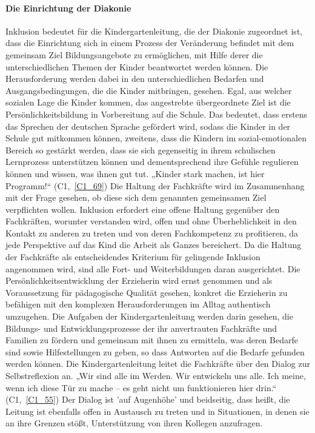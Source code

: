 \paragraph{Die Einrichtung der Diakonie} 
Inklusion bedeutet für die Kindergartenleitung, die der Diakonie zugeordnet ist, dass die Einrichtung sich in einem Prozess der Veränderung befindet mit dem gemeinsam Ziel Bildungsangebote zu ermöglichen, mit Hilfe derer die unterschiedlichen Themen der Kinder beantwortet werden können. Die Herausforderung werden dabei in den unterschiedlichen Bedarfen und Ausgangsbedingungen, die die Kinder mitbringen, gesehen. 
Egal, aus welcher sozialen Lage die Kinder kommen, das angestrebte übergeordnete Ziel ist die Persönlichkeitsbildung in Vorbereitung auf die Schule. Das bedeutet, dass erstens das Sprechen der deutschen Sprache gefördert wird, sodass die Kinder in der Schule gut mitkommen können, zweitens, dass die Kindern im sozial-emotionalen Bereich so gestärkt werden, dass sie sich gegenseitig in ihrem schulischen Lernprozess unterstützen können und dementsprechend ihre Gefühle regulieren können und wissen, was ihnen gut tut. „Kinder stark machen, ist hier Programm!“ (C1,~\ref{C1_69})
Die Haltung der Fachkräfte wird im Zusammenhang mit der Frage gesehen, ob diese sich dem genannten gemeinsamen Ziel verpflichten wollen. Inklusion erfordert eine offene Haltung gegenüber den Fachkräften, worunter verstanden wird, offen und ohne Überheblichkeit in den Kontakt zu anderen zu treten und von deren Fachkompetenz zu profitieren, da jede Perspektive auf das Kind die Arbeit als Ganzes bereichert.
Da die Haltung der Fachkräfte als entscheidendes Kriterium für gelingende Inklusion angenommen wird, sind alle Fort- und Weiterbildungen daran ausgerichtet. Die Persönlichkeitsentwicklung der Erzieherin wird ernst genommen und als Voraussetzung für pädagogische Qualität gesehen, konkret die Erzieherin zu befähigen mit den komplexen Herausforderungen im Alltag authentisch umzugehen. 
Die Aufgaben der Kindergartenleitung werden darin gesehen, die Bildungs- und Entwicklungsprozesse der ihr anvertrauten Fachkräfte und Familien zu fördern und gemeinsam mit ihnen zu ermitteln, was deren Bedarfe sind sowie Hilfestellungen zu geben, so dass Antworten auf die Bedarfe gefunden werden können. Die Kindergartenleitung leitet die Fachkräfte über den Dialog zur Selbstreflexion an. „Wir sind alle im Werden. Wir entwickeln uns alle. Ich meine, wenn ich diese Tür zu mache -- es geht nicht um funktionieren hier drin.“ (C1,~\ref{C1_55}) Der Dialog ist 'auf Augenhöhe' und beidseitig, dass heißt, die Leitung ist ebenfalls offen in Austausch zu treten und in Situationen, in denen sie an ihre Grenzen stößt, Unterstützung von ihren Kollegen anzufragen. 
